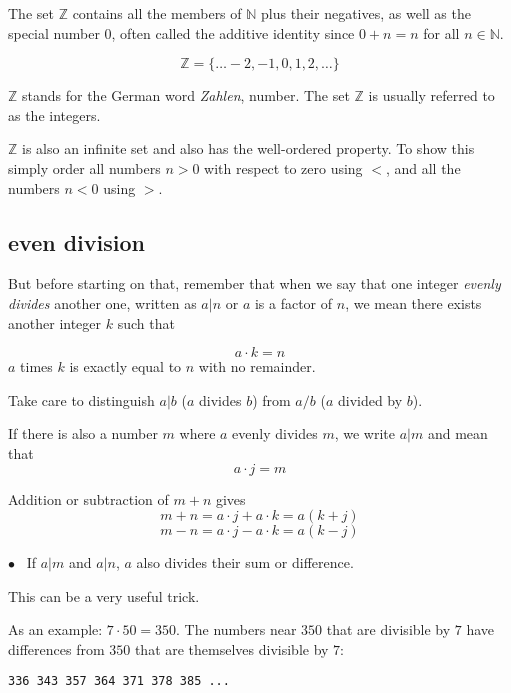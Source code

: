 \documentclass[11pt, oneside]{article}
\begin{document}
The set $\mathbb{Z}$ contains all the members of $\mathbb{N}$ plus their negatives, as well as the special number $0$, often called the additive identity since $0 + n = n$ for all $n \in \mathbb{N}$.

\[ \mathbb{Z} = \{ \dots -2, -1, 0, 1, 2, \dots \} \]

$\mathbb{Z}$ stands for the German word \emph{Zahlen}, number.  The set $\mathbb{Z}$ is usually referred to as the integers.

$\mathbb{Z}$ is also an infinite set and also has the well-ordered property.  To show this simply order all numbers $n > 0$ with respect to zero using $<$, and all the numbers $n < 0$ using $>$.

\subsection*{even division}

But before starting on that, remember that when we say that one integer \emph{evenly divides} another one, written as $a|n$ or $a$ is a factor of $n$, we mean there exists another integer $k$ such that

\[ a \cdot k = n \]
$a$ times $k$ is exactly equal to $n$ with no remainder.

Take care to distinguish $a|b$ ($a$ divides $b$) from $a/b$ ($a$ divided by $b$).

If there is also a number $m$ where $a$ evenly divides $m$, we write $a|m$ and mean that
\[ a \cdot j = m \]

Addition or subtraction of $m + n$ gives
\[ m + n = a \cdot j + a \cdot k = a(k + j) \]
\[ m - n = a \cdot j - a \cdot k = a(k - j) \]

$\bullet$ \ If $a|m$ and $a|n$, $a$ also divides their sum or difference.

This can be a very useful trick.

As an example:  $7 \cdot 50 = 350$.  The numbers near $350$ that are divisible by $7$ have differences from $350$ that are themselves divisible by $7$:

\begin{verbatim}
336 343 357 364 371 378 385 ...
\end{verbatim}
\end{document}
